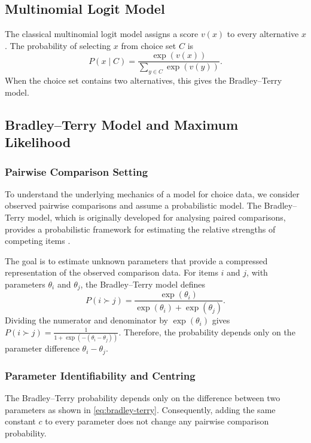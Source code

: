 \documentclass[11pt,a4paper]{article}
\begin{document}
\subsection{Multinomial Logit Model}
The classical multinomial logit model assigns a score \(v(x)\) to every
alternative \(x\). The probability of selecting \(x\) from choice set \(C\)
is
\begin{equation}
    P(x\mid C)
    =
    \frac{\exp(v(x))}
    {\displaystyle\sum_{y\in C}\exp(v(y))}.
    \label{eq:mnl}
\end{equation}
When the choice set contains two alternatives, this gives the Bradley--Terry model.


\subsection[Bradley--Terry model and estimation]{Bradley--Terry Model and Maximum Likelihood}
\subsubsection[Pairwise comparison setting]{Pairwise Comparison Setting}
To understand the underlying mechanics of a model for choice data, we
consider observed pairwise comparisons and assume a probabilistic model.
The Bradley--Terry model, which is originally developed for analysing
paired comparisons, provides a probabilistic framework for
estimating the relative strengths of competing items
\citep{bradleyterry1952}.

The goal is to estimate unknown parameters that provide a compressed
representation of the observed comparison data.
For items \(i\) and \(j\), with parameters \(\theta_i\) and \(\theta_j\), the
Bradley--Terry model defines
\begin{equation}
    P(i\succ j)
    =
    \frac{\exp(\theta_i)}
    {\exp(\theta_i)+\exp(\theta_j)}.
    \label{eq:bradley-terry}
\end{equation}
Dividing the numerator and denominator by \(\exp(\theta_i)\) gives
\(P(i\succ j) = \frac{1} {1+\exp\left(-(\theta_i-\theta_j)\right)}.\)
Therefore, the probability depends only on the parameter difference
\(\theta_i-\theta_j\).

\subsubsection[Identifiability and centring]{Parameter Identifiability and Centring}

The Bradley--Terry probability depends only on the difference between
two parameters as shown in \cref{eq:bradley-terry}. Consequently, adding the same constant \(c\) to every
parameter does not change any pairwise comparison probability.
\end{document}
